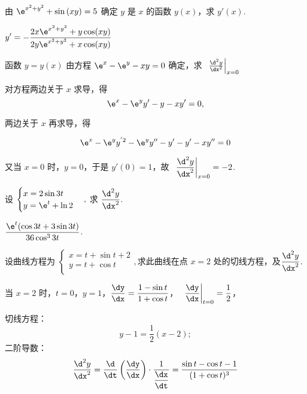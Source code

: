\begin{problem}
	由 $\e^{x^{2} + y^{2}} + \sin\left( {xy} \right) = 5$ 确定 $y$ 是
$x$ 的函数 $y(x)$，求 $y'(x)$.

\begin{solution}
$\displaystyle y' = - \frac{2x\e^{x^{2} + y^{2}} + y\cos(xy)}{2y\e^{x^{2} + y^{2}} + x\cos(xy)}$
\end{solution}

\end{problem}

\begin{problem}
	函数 $y = y(x)$ 由方程 $\e^{x} - \e^{y} - xy = 0$ 确定，求
$\left. \ \frac{\d^{2}y}{\dx^{2}} \right|_{x = 0}$

\begin{solution}
	对方程两边关于 $x$ 求导，得
$$\e^{x} - \e^{y}y' - y - xy' = 0,$$

两边关于 $x$ 再求导，得

$$\e^{x} - \e^{y}y^{'2} - \e^{y}y'' - y' - y' - xy'' = 0$$

又当 $x = 0$ 时，$y = 0$，于是 $y'(0) = 1$，故
$\displaystyle \left. \ \frac{\d^{2}y}{\dx^{2}} \right|_{x = 0} = - 2$.
\end{solution}

\end{problem}

\begin{problem}
	设 $\begin{cases}
x = 2\sin 3t \\
y = \e^{t} + \ln 2 \\
\end{cases},$ 求 $\displaystyle \frac{\d^{2}y}{\dx^{2}}$.

\begin{solution}
   $\displaystyle \frac{\e^{t}(\cos 3t + 3\sin 3t)}{36\cos^{3}3t}$.
\end{solution}

\end{problem}

\begin{problem}
	设曲线方程为 $ \begin{cases}
x = t + \sin t + 2 \\
y = t + \cos t \\
\end{cases}, $求此曲线在点 $x = 2$
处的切线方程，及$\displaystyle \frac{\d^{2}y}{\dx^{2}}$.

\begin{solution}
当 $x = 2$
时，$t = 0$，$y = 1$，$\displaystyle \frac{{\dy}}{\dx} = \frac{1 - \sin t}{1 + \cos t}$，
$\displaystyle \left. \ \frac{{\dy}}\dx \right|_{t = 0} = \frac{1}{2}$，

切线方程：$$y - 1 = \frac{1}{2}\left( x - 2 \right);$$
二阶导数：
$$\frac{\d^{2}y}{\dx^{2}} = \frac{\d}{{\dt}}\left( \frac{{\dy}}{\dx} \right) \cdot \frac{1}{\displaystyle \frac{\dx}{{\dt}}} = \frac{\sin t - \cos t - 1}{(1 + \cos t)^{3}}$$
\end{solution}

\end{problem}

